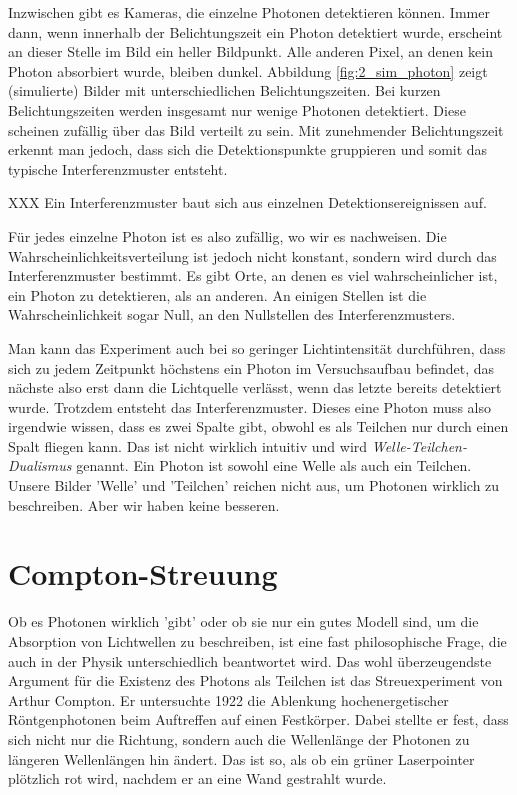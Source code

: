  Inzwischen gibt es Kameras, die einzelne Photonen detektieren können. Immer dann, wenn innerhalb der Belichtungszeit ein Photon detektiert wurde, erscheint an dieser Stelle im Bild ein heller Bildpunkt. Alle anderen Pixel, an denen kein Photon absorbiert wurde, bleiben dunkel. Abbildung  \ref{fig:2_sim_photon} zeigt (simulierte) Bilder mit unterschiedlichen Belichtungszeiten. Bei kurzen Belichtungszeiten werden insgesamt nur wenige Photonen detektiert. Diese scheinen zufällig über das Bild verteilt zu sein. Mit zunehmender Belichtungszeit erkennt man jedoch, dass sich die Detektionspunkte gruppieren und somit das typische Interferenzmuster entsteht.

\begin{marginfigure}
    \caption{XXX Ein Interferenzmuster baut sich aus einzelnen Detektionsereignissen auf.}
    \label{fig:2_sim_photon}
\end{marginfigure}

 Für jedes einzelne Photon ist es also zufällig, wo wir es nachweisen. Die Wahrscheinlichkeitsverteilung ist jedoch nicht konstant, sondern wird durch das Interferenzmuster bestimmt. Es gibt Orte, an denen es viel wahrscheinlicher ist, ein Photon zu detektieren, als an anderen. An einigen Stellen ist die Wahrscheinlichkeit sogar Null, an den Nullstellen des Interferenzmusters.

 Man kann das Experiment auch bei so geringer Lichtintensität durchführen, dass sich zu jedem Zeitpunkt höchstens ein Photon im Versuchsaufbau befindet, das nächste also erst dann die Lichtquelle verlässt, wenn das letzte bereits detektiert wurde. Trotzdem entsteht das Interferenzmuster. Dieses eine Photon muss also irgendwie wissen, dass es zwei Spalte gibt, obwohl es als Teilchen nur durch einen Spalt fliegen kann. Das ist nicht wirklich intuitiv und wird \emph{Welle-Teilchen-Dualismus} genannt. Ein Photon ist sowohl eine Welle als auch ein Teilchen. Unsere Bilder 'Welle' und 'Teilchen' reichen nicht aus, um Photonen wirklich zu beschreiben. Aber wir haben keine besseren.



 \section{Compton-Streuung}

 Ob es Photonen wirklich 'gibt' oder ob sie nur ein gutes Modell sind, um die Absorption von Lichtwellen zu beschreiben, ist eine fast philosophische Frage, die auch in der Physik unterschiedlich beantwortet wird. Das wohl überzeugendste Argument für die Existenz des Photons als Teilchen ist das Streuexperiment von Arthur Compton. Er untersuchte 1922 die Ablenkung hochenergetischer Röntgenphotonen beim Auftreffen auf einen Festkörper. Dabei stellte er fest, dass sich nicht nur die Richtung, sondern auch die Wellenlänge der Photonen zu längeren Wellenlängen hin ändert. Das ist so, als ob ein grüner Laserpointer plötzlich rot wird, nachdem er an eine Wand gestrahlt wurde.

